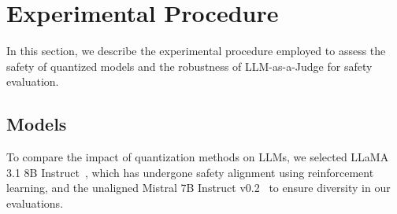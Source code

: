 










\section{Experimental Procedure}

In this section, we describe the experimental procedure employed to assess the safety of quantized models and the robustness of LLM-as-a-Judge for safety evaluation. 



\subsection{Models}

To compare the impact of quantization methods on LLMs, we selected LLaMA 3.1 8B Instruct~\cite{dubey2024llama}, which has undergone safety alignment using reinforcement learning, and the unaligned Mistral 7B Instruct v0.2~\cite{jiang2023mistral7b} to ensure diversity in our evaluations.

